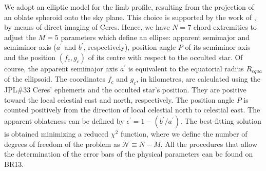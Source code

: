 \documentclass[useAMS,usenatbib]{mn2e}
\begin{document}
We adopt an elliptic model for the limb profile, resulting from the projection of an oblate spheroid onto the sky plane. This choice is supported by the work of \cite{Drummond2014}, by means of direct imaging of Ceres. Hence, we have $N=7$ chord extremities to adjust the $M=5$ parameters which define an ellipse: apparent semimajor and semiminor axis ($a^\prime$ and $b^\prime$, respectively), position angle $P$ of its semiminor axis and the position $(f_c,g_c)$ of its centre with respect to the occulted star. 
Of course, the apparent semimajor axis {$a^\prime$} is equivalent to the equatorial radius $R_{equa}$ of the ellipsoid.
The coordinates $f_{c}$ and $g_{c}$, in kilometres, are calculated using the JPL\#33 Ceres' ephemeris \citep{Giorgini1996} and the occulted star's position. They are positive toward the local celestial east and north, respectively. The position angle $P$ is counted positively from the direction of local celestial north to celestial east. The apparent oblateness can be defined by $\epsilon^\prime = 1 - (b^\prime/a^\prime)$. The best-fitting solution is obtained minimizing a reduced $\chi^{2}$ function, where we define the number of degrees of freedom of the problem as $\mathcal{N} \equiv N - M$.  All the procedures that allow the determination of the error bars of the physical parameters can be found on BR13.

\end{document}
